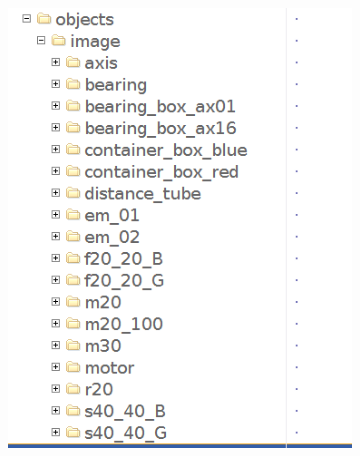 \begin{center}
	\begin{figure}
		\begin{subfigure}{.5\textwidth}
			\centering
			\includegraphics[width=1\linewidth]{images/folder_image}
			\label{Fig:fsila}
		\end{subfigure}
		\begin{subfigure}{.5\textwidth}
			\centering

\end{subfigure}
\end{figure}
\end{center}
